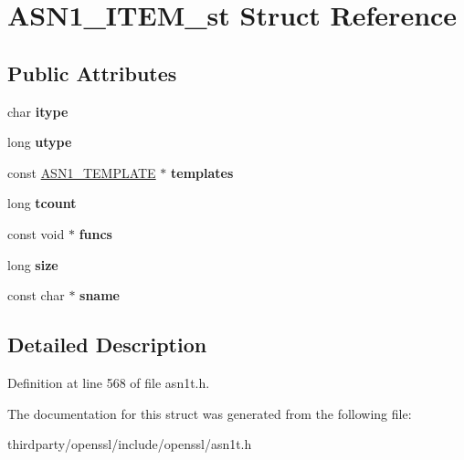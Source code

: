 \hypertarget{struct_a_s_n1___i_t_e_m__st}{}\section{A\+S\+N1\+\_\+\+I\+T\+E\+M\+\_\+st Struct Reference}
\label{struct_a_s_n1___i_t_e_m__st}
\subsection*{Public Attributes}
\begin{DoxyCompactItemize}
\item 
\mbox{\label{struct_a_s_n1___i_t_e_m__st_a303cc31bacb86b92451cb5b389e57440}} 
char {\bfseries itype}
\item 
\mbox{\label{struct_a_s_n1___i_t_e_m__st_a49602e67011b80d23622751f6ce154f5}} 
long {\bfseries utype}
\item 
\mbox{\label{struct_a_s_n1___i_t_e_m__st_a63735dc5d18e7f66b3071f4ca76e8462}} 
const \hyperlink{struct_a_s_n1___t_e_m_p_l_a_t_e__st}{A\+S\+N1\+\_\+\+T\+E\+M\+P\+L\+A\+TE} $\ast$ {\bfseries templates}
\item 
\mbox{\label{struct_a_s_n1___i_t_e_m__st_a52bce8167464f68b77aeeabf7b8c26d9}} 
long {\bfseries tcount}
\item 
\mbox{\label{struct_a_s_n1___i_t_e_m__st_abb4e623222d55a9c7b203c9b29e5aefe}} 
const void $\ast$ {\bfseries funcs}
\item 
\mbox{\label{struct_a_s_n1___i_t_e_m__st_a5f11bb1968cd49b114d1459ecb9574d9}} 
long {\bfseries size}
\item 
\mbox{\label{struct_a_s_n1___i_t_e_m__st_a2375aeececad55dcefd782c78a661fe6}} 
const char $\ast$ {\bfseries sname}
\end{DoxyCompactItemize}


\subsection{Detailed Description}


Definition at line 568 of file asn1t.\+h.



The documentation for this struct was generated from the following file\+:\begin{DoxyCompactItemize}
\item 
thirdparty/openssl/include/openssl/asn1t.\+h\end{DoxyCompactItemize}
